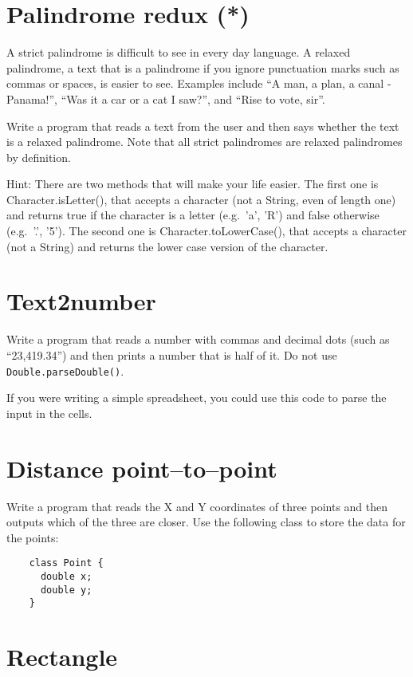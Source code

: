 \documentclass{article}
\begin{document}
\section{Palindrome redux (*)}
\label{sec:palindrome-redux}

A strict palindrome is difficult to see in every day language. A
relaxed palindrome, a text that is a palindrome if you ignore
punctuation marks such as commas or spaces, is easier to see. Examples
include ``A man, a plan, a canal - Panama!'', ``Was it a car or a cat
I saw?'', and ``Rise to vote, sir''. 

Write a program that reads a text from the user and then says whether
the text is a relaxed palindrome. Note that all strict palindromes are
relaxed palindromes by definition. 

Hint: There are two methods that will make your life easier. The first
one is Character.isLetter(), that accepts a character (not a String,
even of length one) and returns true if the character is a letter
(e.g.~'a', 'R') and false otherwise (e.g.~'.', '5'). The second one is
Character.toLowerCase(), that accepts a character (not a String) and
returns the lower case version of the character. 

\section{Text2number}
\label{sec:text2number}

Write a program that reads a number with commas and decimal dots (such
as ``23,419.34'') and then prints a number that is half of it. Do not
use \verb+Double.parseDouble()+. 

If you were writing a simple spreadsheet, you could use this code to
parse the input in the cells. 

\section{Distance point--to--point}
\label{sec:distance-point-point}

Write a program that reads the X and Y coordinates of three points and
then outputs which of the three are closer. Use the following class
to store the data for the points: 

\begin{verbatim}
    class Point {
      double x;
      double y;
    }
\end{verbatim}

\section{Rectangle}
\label{sec:rectangle}
\end{document}
